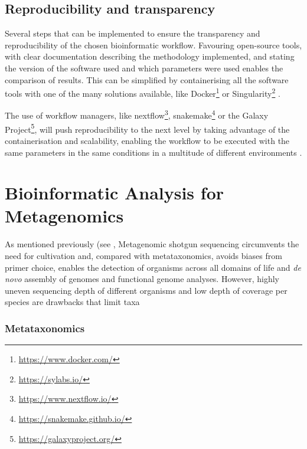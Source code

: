 \subsection{Reproducibility and transparency} \label{ssec:_intro_reproducibility}

Several steps that can be implemented to ensure the transparency and reproducibility of the chosen bioinformatic workflow. 
Favouring open-source tools, with clear documentation describing the methodology implemented, and stating the version of the software used and which parameters were used enables the comparison of results. 
This can be simplified by containerising all the software tools with one of the many solutions available, like Docker\footnote{\url{https://www.docker.com/}} or Singularity\footnote{\url{https://sylabs.io/}} \citep{kurtzer_singularity_2017}. 

The use of workflow managers, like nextflow\footnote{\url{https://www.nextflow.io/}}, snakemake\footnote{\url{https://snakemake.github.io/}} or the Galaxy Project\footnote{\url{https://galaxyproject.org/}}, will push reproducibility to the next level by taking advantage of the containerisation and scalability, enabling the workflow to be executed with the same parameters in the same conditions in a multitude of different environments \citep{di_tommaso_nextflow_2017, molder_sustainable_2021, afgan_galaxy_2018}. 


\section{Bioinformatic Analysis for Metagenomics} \label{sec:_intro_metagenomics_bioinfo}

As mentioned previously (see , Metagenomic shotgun sequencing circumvents the need for cultivation and, compared with metataxonomics, avoids biases from primer choice, enables the detection of organisms across all domains of life and \textit{de novo} assembly of genomes and functional genome analyses. However, highly uneven sequencing depth of different organisms and low depth of coverage per species are drawbacks that limit taxa

\subsubsection{Metataxonomics} \label{ssec:_intro_metataxonomics_bioinfo}

